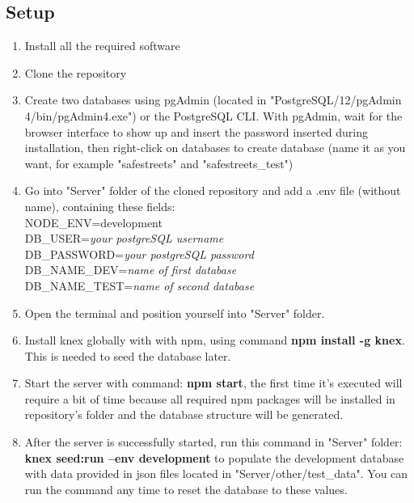 \subsection{Setup}
\begin{enumerate}
	\item Install all the required software
	\item Clone the repository
	\item Create two databases using pgAdmin (located in "PostgreSQL/12/pgAdmin 4/bin/pgAdmin4.exe") or the PostgreSQL CLI. With pgAdmin, wait for the browser interface to show up and insert the password inserted during installation, then right-click on databases to create database (name it as you want, for example "safestreets" and "safestreets\_test")
	\item Go into "Server" folder of the cloned repository and add a .env file (without name), containing these fields:\\
	NODE\_ENV=development\\
	DB\_USER=\textit{your postgreSQL username}\\
	DB\_PASSWORD=\textit{your postgreSQL password}\\
	DB\_NAME\_DEV=\textit{name of first database}\\
	DB\_NAME\_TEST=\textit{name of second database}\\
	\item Open the terminal and position yourself into "Server" folder.
	\item Install knex globally with with npm, using command \textbf{npm install -g knex}. This is needed to seed the database later.
	\item Start the server with command: \textbf{npm start}, the first time it's executed will require a bit of time because all required npm packages will be installed in repository's folder and the database structure will be generated.
	\item After the server is successfully started, run this command in "Server" folder: \textbf{knex seed:run --env development} to populate the development database with data provided in json files located in "Server/other/test\_data". You can run the command any time to reset the database to these values.
\end{enumerate}

